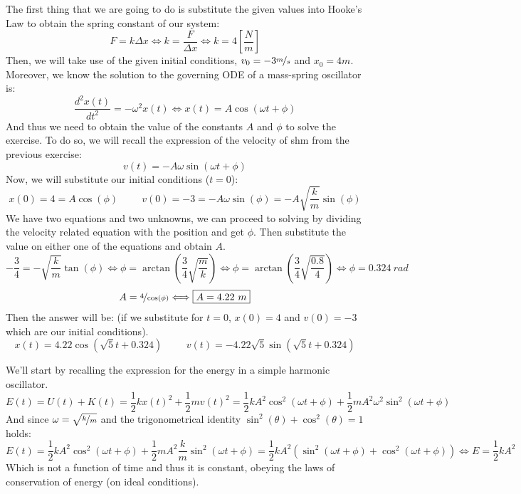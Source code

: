 \documentclass{report}
\begin{document}
  \noindent The first thing that we are going to do is substitute the given values into Hooke's Law to obtain the spring constant of our system:
  \[F=k\Delta x\Longleftrightarrow k = \dfrac{F}{\Delta x}\Longleftrightarrow k = 4 \left[\dfrac{N}{m}\right]\]
  \noindent Then, we will take use of the given initial conditions, $v_0=-3 \nicefrac{m}{s}$ and $x_0=4 m$. Moreover, we know the solution to the governing ODE of a mass-spring oscillator is:
  \[\dfrac{d^2x(t)}{dt^2}=-\omega^2x(t)\Longleftrightarrow x(t)=A\cos(\omega t+\phi)\]
  \noindent And thus we need to obtain the value of the constants $A$ and $\phi$ to solve the exercise. To do so, we will recall the expression of the velocity of shm from the previous exercise:
  \[v(t)=-A\omega\sin(\omega t + \phi)\]
  \noindent Now, we will substitute our initial conditions ($t=0$):
  \[x(0)=4=A\cos(\phi)\hspace{1cm}v(0)=-3=-A\omega\sin(\phi)=-A\sqrt{\dfrac{k}{m}}\sin(\phi)\]
  \noindent We have two equations and two unknowns, we can proceed to solving by dividing the velocity related equation with the position and get $\phi$. Then substitute the value on either one of the equations and obtain $A$.
  \[-\dfrac{3}{4}=-\sqrt{\dfrac{k}{m}}\tan(\phi)\Longleftrightarrow \phi=\arctan\left(\dfrac34 \sqrt{\dfrac{m}{k}}\right) \Longleftrightarrow \phi=\arctan\left(\dfrac34 \sqrt{\dfrac{0.8}{4}}\right)\Longleftrightarrow \boxed{\phi=0.324\ rad}\]
  \[A=\nicefrac{4}{\cos(\phi)}\Longleftrightarrow \boxed{A = 4.22\ m}\]
  \noindent Then the answer will be: (if we substitute for $t=0$, $x(0)=4$ and $v(0)=-3$ which are our initial conditions).
  \[\boxed{x(t)=4.22\cos(\sqrt{5}t+0.324)\hspace{1cm} v(t)=-4.22\sqrt{5}\sin(\sqrt{5}t+0.324)}\]


  \noindent We'll start by recalling the expression for the energy in a simple harmonic oscillator.
  \[E(t)=U(t)+K(t)=\dfrac{1}{2}k{x(t)}^2+\dfrac12 m{v(t)}^2=\dfrac12 kA^2\cos^2(\omega t+\phi)+\dfrac12 mA^2\omega^2\sin^2(\omega t+\phi)\]
  \noindent And since $\omega=\sqrt{\nicefrac{k}{m}}$ and the trigonometrical identity $\sin^2(\theta)+\cos^2(\theta)=1$ holds:
  \[E(t)=\dfrac12 kA^2\cos^2(\omega t+\phi)+\dfrac12 mA^2\dfrac{k}{m}\sin^2(\omega t+\phi)=\dfrac12 kA^2(\sin^2(\omega t+\phi)+\cos^2(\omega t+\phi))\Longleftrightarrow \boxed{E=\dfrac{1}{2}kA^2}\]
  \noindent Which is not a function of time and thus it is constant, obeying the laws of conservation of energy (on ideal conditions).\\
\end{document}
